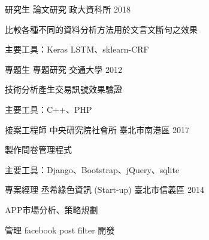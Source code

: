 

\begin{cventries}
  \cventry
    {研究生} %
    {論文研究} %
    {政大資科所} %
    {2018} %
    {
      \begin{cvitems} %
        \item {比較各種不同的資料分析方法用於文言文斷句之效果}
        \item {主要工具：Keras LSTM、sklearn-CRF}
      \end{cvitems}
    }

  \cventry
    {專題生} %
    {專題研究} %
    {交通大學} %
    {2012} %
    {
      \begin{cvitems} %
        \item {技術分析產生交易訊號效果驗證}
        \item {主要工具：C++、PHP}
      \end{cvitems}
    }


  \cventry
    {接案工程師} %
    {中央研究院社會所} %
    {臺北市南港區} %
    {2017} %
    {
      \begin{cvitems} %
        \item {製作問卷管理程式}
        \item {主要工具：Django、Bootstrap、jQuery、sqlite}
      \end{cvitems}
    }

  \cventry
    {專案經理} %
    {丞希綠色資訊 (Start-up)} %
    {臺北市信義區} %
    {2014} %
    {
      \begin{cvitems} %
        \item {APP市場分析、策略規劃}
        \item {管理 facebook post filter 開發}
      \end{cvitems}
    }

\end{cventries}
